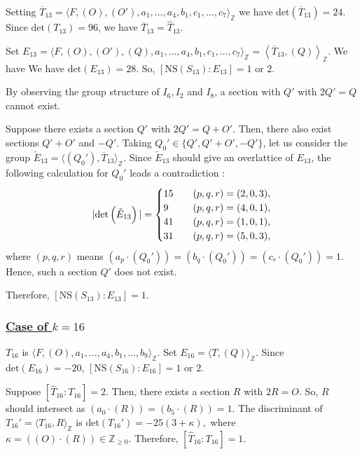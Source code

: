 \documentclass[10pt]{article}
\begin{document}
Setting $\overline{T}_{13}=\langle F,(O),(O'),a_1,\dots,a_4,b_1,c_1,\dots,c_7\rangle_\mathbb{Z} $
we have
$\mathrm{det}\left(\overline{T}_{13}\right)=24$.
Since $\mathrm{det}(T_{13})=96$,
we have $\overline{T}_{13}=\widehat{T}_{13}$.

Set
$E_{13}=\langle F,(O),(O'),(Q),a_1,\dots,a_4,b_1,c_1,\dots,c_7\rangle_\mathbb{Z} =\left\langle \overline{T}_{13},(Q) \right\rangle_\mathbb{Z} $.
We have
We have $\mathrm{det}(E_{13})=28$.
So, $[\mathrm{NS}(S_{13}):E_{13}]=1 \text{ or } 2.$


By observing the group structure of $I_6,I_2$ and $I_8$,
a section with  $Q'$ with $2Q'=Q$ cannot exist.

Suppose there exists a section $Q'$ with $2Q'=Q+O'$.
Then, there also exist sections $Q'+O'$ and $-Q'$.
Taking $Q_0' \in \{Q', Q'+O', -Q'\}$,
let us consider the group $\check{E}_{13}=\langle (Q_0'), \overline{T}_{13} \rangle_\mathbb{Z}$.
Since $\check{E}_{13}$ should give an overlattice of $E_{13}$,
the following calculation  for  $Q_0'$  leads a contradiction :
\begin{align*}
|{\rm det} \left( \check{E}_{13} \right)|
=
\begin{cases}
 15 \quad &(p,q,r)=(2,0,3), \\
 9  \quad &(p,q,r)=(4,0,1),\\
 41 \quad &( p,q,r) = (1,0,1),\\
 31 \quad &( p,q,r)=(5,0,3),
\end{cases}
\end{align*}
where $(p,q,r)$ means $(a_p \cdot (Q_0')) = (b_q \cdot (Q_0')) =(c_r \cdot (Q_0'))=1. $
Hence, such a section $Q'$ does not exist.


Therefore, $[\mathrm{NS}(S_{13}):E_{13}]=1$.




\subsubsection*{\underline{Case   of  $k=16$}}

$T_{16}$ is $\langle F,(O),a_1,\dots,a_4,b_1,\dots,b_9\rangle_\mathbb{Z} $.
Set $E_{16}=\langle T,(Q) \rangle_\mathbb{Z}$.
Since $\mathrm{det}(E_{16})=-20$, $[\mathrm{NS}(S_{16}):E_{16}]=1 \text{ or } 2$.



Suppose $\left[\widehat{T}_{16}:T_{16}\right]=2$.
Then, there exists a section $R$ with $2R=O$.
So, $R$ should intersect as
$(a_0\cdot(R) ) = ( b_5\cdot(R) ) =1.$
The discriminant of $T_{16}'=\langle T_{16},R\rangle_\mathbb{Z}$ is
$
\mathrm{det}(T_{16}')=-25(3+\kappa),
$
where $\kappa=((O) \cdot (R))\in \mathbb{Z}_{\geq 0}.$
Therefore,
$\left[\widehat{T}_{16}:T_{16}\right]=1$.
\end{document}
